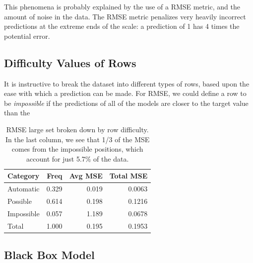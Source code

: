 \documentclass{article}
\begin{document}
This phenomena is probably explained by the use of a RMSE metric, and the amount of noise in the data.  The RMSE metric penalizes very heavily incorrect predictions at the extreme ends of the scale: a prediction of 1 has 4 times the potential error.

\subsection{Difficulty Values of Rows}

It is instructive to break the dataset into different types of rows, based upon the ease with which a prediction can be made.  For RMSE, we could define a row to be \emph{impossible} if the predictions of all of the models are closer to the target value than the

\begin{table}[t]
\caption{RMSE large set broken down by row difficulty.  In the last column, we see that 1/3 of the MSE comes from the impossible positions, which account for just 5.7\% of the data.}
\label{rowtypesrmse}
\vskip 0.15in
\begin{center}
\begin{small}
\begin{sc}
\begin{tabular}{lrrr}
\hline
\abovespace\belowspace
Category & Freq & Avg MSE & Total MSE \\
\hline
\abovespace
Automatic     & 0.329 & 0.019 & 0.0063 \\
Possible      & 0.614 & 0.198 & 0.1216 \\
\belowspace
Impossible    & 0.057 & 1.189 & 0.0678 \\
\hline
Total         & 1.000 & 0.195 & 0.1953 \\
\hline
\end{tabular}
\end{sc}
\end{small}
\end{center}
\vskip -0.1in
\end{table}




\subsection{Black Box Model}


\subsection{}
\end{document}

